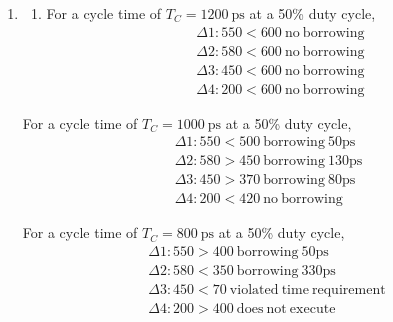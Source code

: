 \documentclass{article}
\begin{document}
\begin{enumerate}[label=\thesubsection]
\begin{enumerate}[label=\alph*)]
\[				\]
				\item 
				\[
					t_{cd_{\mathrm{min}}} = t_{\mathrm{hold}} - t_{ccq} + t_{pw} + t_{\mathrm{skew}} = 30-35+80+50 = 95 \ \mathrm{ps}.
				\]
			\end{enumerate}
			\item
				\begin{enumerate}[label=\alph*)]
					\item For a cycle time of \(T_C = 1200 \ \mathrm{ps}\) at a 50\% duty cycle, 
						\begin{align*}
						 &\Delta 1: 550<600 \ \mathrm{no \ borrowing} \\
						 &\Delta 2: 580<600 \ \mathrm{no \ borrowing} \\
						 &\Delta 3: 450<600 \ \mathrm{no \ borrowing} \\
						 &\Delta 4: 200<600 \ \mathrm{no \ borrowing}
						\end{align*}
				\end{enumerate}
				\begin{enumerate}[label=\alph*)]
					For a cycle time of \(T_C = 1000 \ \mathrm{ps}\) at a 50\% duty cycle, 
						\begin{align*}
						 &\Delta 1: 550<500 \ \mathrm{borrowing} \ 50 \mathrm{ps} \\
						 &\Delta 2: 580>450 \ \mathrm{borrowing} \ 130 \mathrm{ps} \\
						 &\Delta 3: 450>370 \ \mathrm{borrowing} \ 80 \mathrm{ps}\\
						 &\Delta 4: 200<420 \ \mathrm{no \ borrowing}
						\end{align*}
				\end{enumerate}
				\begin{enumerate}[label=\alph*)]
					For a cycle time of \(T_C = 800 \ \mathrm{ps}\) at a 50\% duty cycle, 
						\begin{align*}
						 &\Delta 1: 550>400 \ \mathrm{borrowing} \ 50\mathrm{ps} \\
						 &\Delta 2: 580<350 \ \mathrm{borrowing} \ 330\mathrm{ps}\\
						 &\Delta 3: 450<70 \ \mathrm{violated \ time \ requirement} \ \\
						 &\Delta 4: 200>400 \ \mathrm{does \ not \ execute}
						\end{align*}
				\end{enumerate}
\end{enumerate}
\end{document}
